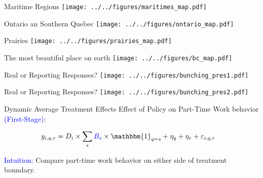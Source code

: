\documentclass{beamer}
\newcommand{\bb}[1]{\mathbbm{#1}}
\begin{document}
\begin{frame}
\end{frame}


\begin{frame}{Maritime Regions}
\centering
	\texttt{[image: ../../figures/maritimes\_map.pdf]}
\end{frame}

\begin{frame}{Ontario an Southern Quebec}
\centering
	\texttt{[image: ../../figures/ontario\_map.pdf]}
\end{frame}

\begin{frame}{Prairies}
\centering
	\texttt{[image: ../../figures/prairies\_map.pdf]}
\end{frame}

\begin{frame}{The most beautiful place on earth}
\centering
	\texttt{[image: ../../figures/bc\_map.pdf]}
\end{frame}


\begin{frame}{Real or Reporting Responses?}
	\texttt{[image: ../../figures/bunching\_pres1.pdf]}
\end{frame}

\begin{frame}{Real or Reporting Responses?}
\texttt{[image: ../../figures/bunching\_pres2.pdf]}
\end{frame}

\begin{frame}{Dynamic Average Treatment Effects}
	Effect of Policy on Part-Time Work behavior \textcolor{blue}{(First-Stage)}:
	
		\begin{align}
		y_{i,q,r} &=  D_{i}\times \sum_{s} \textcolor{blue}{B_{s}}\times \bb{1}_{q=s} + \eta_q + \eta_r  +  \varepsilon_{i,q,r}
		\label{eq:dyn_weekly}
		\end{align}
	
\textcolor{blue}{Intuition:} Compare part-time work behavior on either side of treatment boundary.


\end{frame}
\end{document}
